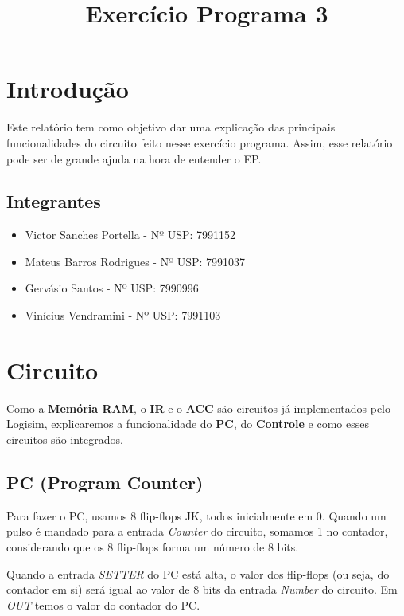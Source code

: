 \documentclass[11pt]{article}
\title{Exercício Programa 3}
\begin{document}
\maketitle

\section{Introduç\~ao}

Este relatório tem como objetivo dar uma explicação das principais funcionalidades do circuito feito nesse exercício programa. Assim, esse relatório pode ser de grande ajuda na hora de entender o EP.


\subsection*{Integrantes}

\begin{itemize}

\item Victor Sanches Portella - Nº USP: 7991152

\item Mateus Barros Rodrigues - Nº USP: 7991037

\item Gervásio Santos - Nº USP: 7990996

\item Vinícius Vendramini - Nº USP: 7991103

\end{itemize}

\section{Circuito}

Como a \textbf{Memória RAM}, o \textbf{IR}  e o \textbf{ACC} são circuitos já implementados pelo Logisim, explicaremos a funcionalidade do \textbf{PC}, do \textbf{Controle} e como esses circuitos são integrados. 

\subsection{PC (Program Counter)}

Para fazer o PC, usamos 8 flip-flops JK, todos inicialmente em 0. Quando um pulso é mandado para a entrada \emph{Counter} do circuito, somamos 1 no contador, considerando que os 8 flip-flops forma um número de 8 bits.

Quando a entrada \emph{SETTER} do PC está alta, o valor dos flip-flops (ou seja, do contador em si) será igual ao valor de 8 bits da entrada 	\emph{Number} do circuito. Em \emph{OUT} temos o valor do contador do PC.
\end{document}
